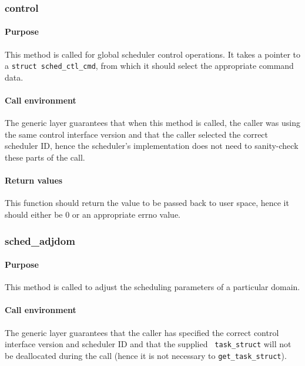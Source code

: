 \documentclass[11pt,twoside,final,openright]{xenstyle}
\begin{document}
\subsubsection{control}

\paragraph*{Purpose}

This method is called for global scheduler control operations.  It takes a
pointer to a {\tt struct sched\_ctl\_cmd}, from which it should select the
appropriate command data.

\paragraph*{Call environment}

The generic layer guarantees that when this method is called, the caller was
using the same control interface version and that the caller selected the
correct scheduler ID, hence the scheduler's implementation does not need to
sanity-check these parts of the call.

\paragraph*{Return values}

This function should return the value to be passed back to user space, hence it
should either be 0 or an appropriate errno value.

\subsubsection{sched\_adjdom}

\paragraph*{Purpose}

This method is called to adjust the scheduling parameters of a particular
domain.

\paragraph*{Call environment}

The generic layer guarantees that the caller has specified the correct
control interface version and scheduler ID and that the supplied {\tt
task\_struct} will not be deallocated during the call (hence it is not
necessary to {\tt get\_task\_struct}).
\end{document}
